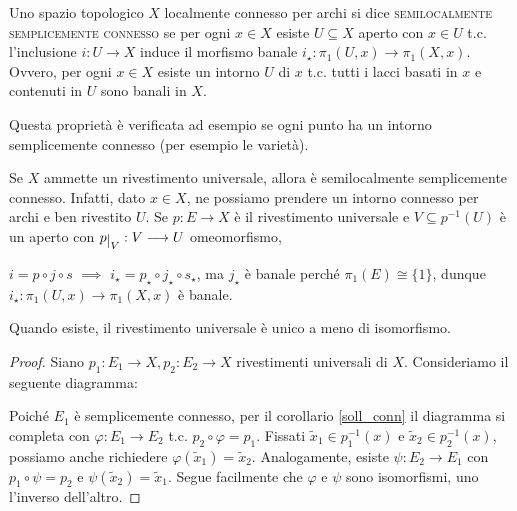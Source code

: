 \begin{defn}
  Uno spazio topologico $X$ localmente connesso per archi si dice \textsc{semilocalmente semplicemente connesso} se per ogni $x \in X$ esiste $U \subseteq X$ aperto con $x \in U$ t.c. l'inclusione $i:U \longrightarrow X$ induce il morfismo banale $i_{\star}:\pi_1(U, x) \longrightarrow \pi_1(X, x)$. Ovvero, per ogni $x \in X$ esiste un intorno $U$ di $x$ t.c. tutti i lacci basati in $x$ e contenuti in $U$ sono banali in $X$.
\end{defn}

Questa proprietà è verificata ad esempio se ogni punto ha un intorno semplicemente connesso (per esempio le varietà).

\begin{oss}
  Se $X$ ammette un rivestimento universale, allora è semilocalmente semplicemente connesso. Infatti, dato $x \in X$, ne possiamo prendere un intorno connesso per archi e ben rivestito $U$. Se $p:E \longrightarrow X$ è il rivestimento universale e $V \subseteq p^{-1}(U)$ è un aperto con $p\restrict{V}:V \longrightarrow U$ omeomorfismo,
  \begin{center}
  \end{center}
  $i=p \circ j \circ s$ $\implies$ $i_{\star}=p_{\star} \circ j_{\star} \circ s_{\star}$, ma $j_{\star}$ è banale perché $\pi_1(E) \cong \{1\}$, dunque $i_{\star}:\pi_1(U, x) \longrightarrow \pi_1(X, x)$ è banale.
\end{oss}

\begin{lm}
  Quando esiste, il rivestimento universale è unico a meno di isomorfismo.
\end{lm}

\begin{proof}
  Siano $p_1:E_1 \longrightarrow X, p_2:E_2 \longrightarrow X$ rivestimenti universali di $X$. Consideriamo il seguente diagramma:
  \begin{center}
  \end{center}
  Poiché $E_1$ è semplicemente connesso, per il corollario \ref{soll_conn} il diagramma si completa con $\varphi:E_1 \longrightarrow E_2$ t.c. $p_2 \circ \varphi=p_1$. Fissati $\tilde{x}_1 \in p_1^{-1}(x)$ e $\tilde{x}_2 \in p_2^{-1}(x)$, possiamo anche richiedere $\varphi(\tilde{x}_1)=\tilde{x}_2$.
  Analogamente, esiste $\psi:E_2 \longrightarrow E_1$ con $p_1 \circ \psi=p_2$ e $\psi(\tilde{x}_2)=\tilde{x}_1$. Segue facilmente che $\varphi$ e $\psi$ sono isomorfismi, uno l'inverso dell'altro.
\end{proof}

